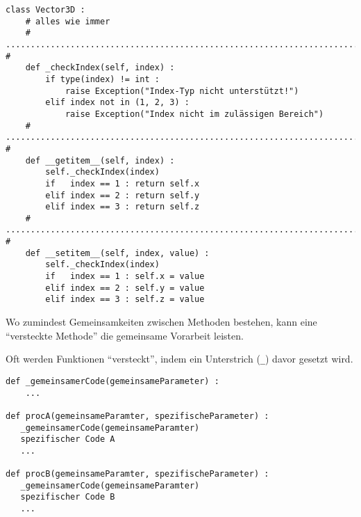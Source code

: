 \begin{frame}[fragile]
%
\begin{codebox}
\begin{verbatim}
class Vector3D :
    # alles wie immer
    # ........................................................................ #
    def _checkIndex(self, index) :
        if type(index) != int :
            raise Exception("Index-Typ nicht unterstützt!")
        elif index not in (1, 2, 3) :
            raise Exception("Index nicht im zulässigen Bereich")
    # ........................................................................ #    
    def __getitem__(self, index) :
        self._checkIndex(index)
        if   index == 1 : return self.x
        elif index == 2 : return self.y
        elif index == 3 : return self.z    
    # ........................................................................ #    
    def __setitem__(self, index, value) :
        self._checkIndex(index)
        if   index == 1 : self.x = value
        elif index == 2 : self.y = value
        elif index == 3 : self.z = value
\end{verbatim}
\end{codebox}
%
\end{frame}


\begin{frame}[fragile]
%
\begin{hintbox}
Wo zumindest Gemeinsamkeiten zwischen Methoden bestehen, kann eine \enquote{versteckte Methode} die gemeinsame Vorarbeit leisten.

Oft werden Funktionen \enquote{versteckt}, indem ein Unterstrich (\texttt{\_}) davor gesetzt wird.
\end{hintbox}
%
\begin{codebox}
\begin{verbatim}
def _gemeinsamerCode(gemeinsameParameter) :
    ...

def procA(gemeinsameParamter, spezifischeParameter) :
   _gemeinsamerCode(gemeinsameParamter)
   spezifischer Code A
   ...

def procB(gemeinsameParamter, spezifischeParameter) :
   _gemeinsamerCode(gemeinsameParamter)
   spezifischer Code B
   ...
\end{verbatim}
\end{codebox}
%
\end{frame}

